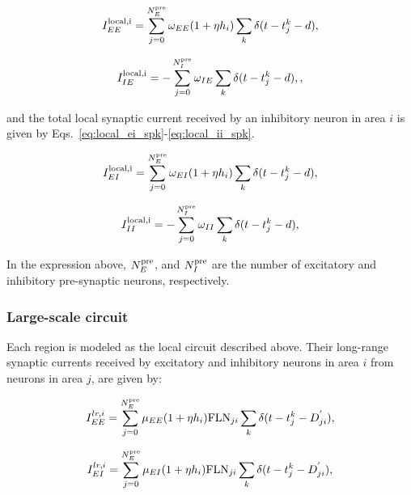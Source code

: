 \begin{equation}
        I^{\rm local,i}_{EE} = \sum_{j=0}^{N_{E}^{\rm pre}}\omega_{EE}(1+\eta h_{i})\sum_{k}\delta(t-t_{j}^{k}-d),
     \label{eq:local_ee_spk}
\end{equation}

\begin{equation}
        I^{\rm local,i}_{IE} = -\sum_{j=0}^{N_{I}^{\rm pre}}\omega_{IE}\sum_{k}\delta(t-t_{j}^{k}-d),
        \label{eq:local_ie_spk},
\end{equation}

\noindent and the total local synaptic current received by an inhibitory neuron in area $i$ is given by Eqs.~\ref{eq:local_ei_spk}-\ref{eq:local_ii_spk}.

\begin{equation}
        I^{\rm local,i}_{EI} = \sum_{j=0}^{N_{E}^{\rm pre}}\omega_{EI}(1+\eta h_{i})\sum_{k}\delta(t-t_{j}^{k}-d),
        \label{eq:local_ei_spk}
\end{equation}

\begin{equation}
        I^{\rm local,i}_{II} = -\sum_{j=0}^{N_{I}^{\rm pre}}\omega_{II}\sum_{k}\delta(t-t_{j}^{k}-d),
        \label{eq:local_ii_spk}
\end{equation}

\noindent In the expression above, $N_E^{\rm pre}$, and $N_I^{\rm pre}$ are the number of excitatory and inhibitory pre-synaptic neurons, respectively.

\subsubsection{Large-scale circuit}\label{lr_spk} Each region is modeled as the local circuit described above. Their long-range synaptic currents received by excitatory and inhibitory neurons in area $i$ from neurons in area $j$, are given by:

\begin{equation}
    I^{lr,i}_{EE} = \sum_{j=0}^{N_E^{\rm pre}}\mu_{EE}(1+\eta h_{i})\text{FLN}_{ji}\sum_{k}\delta(t-t_{j}^{k}-D^{'}_{ji}),
    \label{eq:lr_ee_spk}
\end{equation}

\begin{equation}
    I^{lr,i}_{EI} = \sum_{j=0}^{N_E^{\rm pre}}\mu_{EI}(1+\eta h_{i})\text{FLN}_{ji}\sum_{k}\delta(t-t_{j}^{k}-D^{'}_{ji}),
    \label{eq:lr_ei_spk}
\end{equation}

